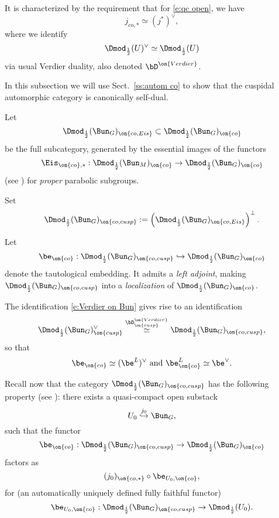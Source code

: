 \documentclass[9pt]{amsart}
\theoremstyle{remark}
\theoremstyle{definition}
\theoremstyle{remark}
\newcommand{\secref}[1]{Sect.~\ref{#1}}
\numberwithin{equation}{section}
\begin{document}
It is characterized by the requirement that for \eqref{e:qc open}, we have
$$j_{co,*} \simeq (j^*)^\vee,$$
where we identify 
$$\Dmod_{\frac{1}{2}}(U)^\vee \simeq \Dmod_{\frac{1}{2}}(U)$$
via usual Verdier duality, also denoted $\bD^{\on{Verdier}}$.

 \label{ss:cusp co}

In this subsection we will use \secref{ss:autom co} to show that the cuspidal automorphic category is canonically self-dual. 

\sssec{}

Let 
$$\Dmod_{\frac{1}{2}}(\Bun_G)_{\on{co,Eis}}\subset \Dmod_{\frac{1}{2}}(\Bun_G)_{\on{co}}$$
be the full subcategory, generated by the essential images of the functors
$$\Eis_{\on{co},*}:\Dmod_{\frac{1}{2}}(\Bun_M)_{\on{co}}\to \Dmod_{\frac{1}{2}}(\Bun_G)_{\on{co}}$$
(see \cite[Sect. 1.4]{Ga1}) for \emph{proper} parabolic subgroups.

\medskip

Set
$$\Dmod_{\frac{1}{2}}(\Bun_G)_{\on{co,cusp}}:=\left(\Dmod_{\frac{1}{2}}(\Bun_G)_{\on{co,Eis}}\right)^\perp.$$

Let 
$$\be_{\on{co}}:\Dmod_{\frac{1}{2}}(\Bun_G)_{\on{co,cusp}}\hookrightarrow \Dmod_{\frac{1}{2}}(\Bun_G)_{\on{co}}$$
denote the tautological embedding. It admits a \emph{left adjoint}, making $\Dmod_{\frac{1}{2}}(\Bun_G)_{\on{co,cusp}}$
into a \emph{localization} of $\Dmod_{\frac{1}{2}}(\Bun_G)_{\on{co}}$. 

\sssec{}

The identification \eqref{e:Verdier on Bun} gives rise to an identification
\begin{equation} \label{e:dual of cusp}
\Dmod_{\frac{1}{2}}(\Bun_G)_{\on{cusp}}^\vee \overset{\bD^{\on{Verdier}}_{\on{cusp}}}\simeq \Dmod_{\frac{1}{2}}(\Bun_G)_{\on{co,cusp}},
\end{equation} 
so that
$$\be_{\on{co}}\simeq (\be^L)^\vee \text{ and } \be^L_{\on{co}}\simeq \be^\vee.$$

\sssec{} \label{sss:U 0}

Recall now that the category $\Dmod_{\frac{1}{2}}(\Bun_G)_{\on{co,cusp}}$ has the following property
(see \cite[Proposition 2.3.4]{Ga1}): there exists a quasi-compact open substack
$$U_0\overset{j_0}\hookrightarrow \Bun_G,$$
such that the functor
$$\be_{\on{co}}:\Dmod_{\frac{1}{2}}(\Bun_G)_{\on{co,cusp}} \to \Dmod_{\frac{1}{2}}(\Bun_G)_{\on{co}}$$
factors as
$$(j_0)_{\on{co,*}}\circ \be_{U_0,\on{co}},$$
for (an automatically uniquely defined fully faithful functor)
$$\be_{U_0,\on{co}}:\Dmod_{\frac{1}{2}}(\Bun_G)_{\on{co,cusp}}\to \Dmod_{\frac{1}{2}}(U_0).$$
\end{document}
